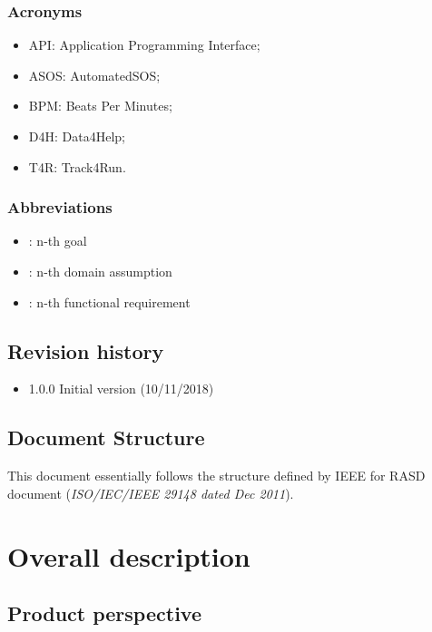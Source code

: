 \documentclass{article}
\begin{document}
\subsubsection{Acronyms}
\begin{itemize}
\item API: Application Programming Interface;
\item ASOS: AutomatedSOS;
\item BPM: Beats Per Minutes;
\item D4H: Data4Help;
\item T4R: Track4Run.
\end{itemize}

\subsubsection{Abbreviations}
\begin{itemize}
		\item \begin{math}[Gn]\end{math}: n-th goal
		\item \begin{math}[Dn]\end{math}: n-th domain assumption 
		\item \begin{math}[Rn]\end{math}: n-th functional requirement
\end{itemize}

\subsection{Revision history}
\begin{itemize}
	\item 1.0.0 Initial version (10/11/2018)
\end{itemize}
\subsection{Document Structure}
This document essentially follows the structure defined by IEEE for RASD document (\textit{ISO/IEC/IEEE 29148 dated Dec 2011}).

\newpage
\section{Overall description}

\subsection{Product perspective}
\end{document}
